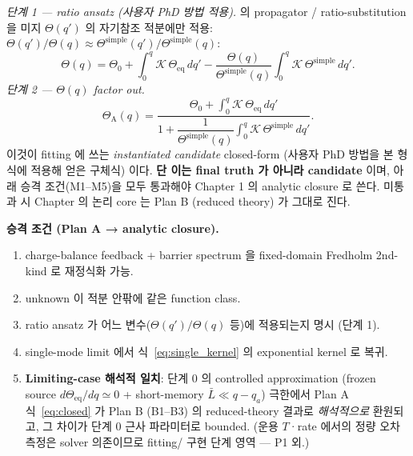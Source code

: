 \documentclass[11pt,a4paper]{article}
\newcommand{\eq}{\mathrm{eq}}
\newcommand{\simplecase}{\mathrm{simple}}
\begin{document}
\emph{단계 1 — ratio ansatz (사용자 PhD 방법 적용).} \cite{lee2011,son2013} 의 propagator /
ratio-substitution 을 미지 $\Theta(q')$ 의 자기참조 적분에만 적용:
$\Theta(q')/\Theta(q)\approx\Theta^{\simplecase}(q')/\Theta^{\simplecase}(q)$:
\begin{equation}
\Theta(q)=\Theta_0+\int_0^q\!\mathcal K\,\Theta_\eq\,dq'
-\frac{\Theta(q)}{\Theta^{\simplecase}(q)}\int_0^q\!\mathcal K\,\Theta^{\simplecase}\,dq'.
\label{eq:closed_pre}
\end{equation}
\emph{단계 2 — $\Theta(q)$ factor out.}
\begin{equation}
\boxed{\;\Theta_{\mathrm A}(q)=\frac{\Theta_0+\displaystyle\int_0^q \mathcal K\,\Theta_\eq\,dq'}
{1+\dfrac{1}{\Theta^{\simplecase}(q)}\displaystyle\int_0^q \mathcal K\,\Theta^{\simplecase}\,dq'}.\;}
\label{eq:closed}
\end{equation}
이것이 fitting 에 쓰는 \emph{instantiated candidate} closed-form (사용자 PhD 방법을 본 형식에
적용해 얻은 구체식) 이다. \textbf{단 이는 final truth 가 아니라 candidate} 이며, 아래 승격
조건(M1--M5)을 모두 통과해야 Chapter 1 의 analytic closure 로 쓴다. 미통과 시 Chapter 의
논리 core 는 Plan B (reduced theory) 가 그대로 진다.

\textbf{승격 조건 (Plan A → analytic closure).}
\begin{enumerate}[label=\textbf{M\arabic*.}]
\item charge-balance feedback + barrier spectrum 을 fixed-domain Fredholm 2nd-kind 로
  재정식화 가능.
\item unknown 이 적분 안팎에 같은 function class.
\item ratio ansatz 가 어느 변수($\Theta(q')/\Theta(q)$ 등)에 적용되는지 명시 (단계 1).
\item single-mode limit 에서 식~\eqref{eq:single_kernel} 의 exponential kernel 로 복귀.
\item \textbf{Limiting-case 해석적 일치}: 단계 0 의 controlled approximation (frozen source
  $d\Theta_\eq/dq\simeq0$ + short-memory $\bar L\ll q-q_a$) 극한에서 Plan A 식~\eqref{eq:closed}
  가 Plan B (B1--B3) 의 reduced-theory 결과로 \emph{해석적으로} 환원되고, 그 차이가 단계 0
  근사 파라미터로 bounded. (운용 $T$·rate 에서의 정량 오차 측정은 solver 의존이므로 fitting/
  구현 단계 영역 — P1 외.)
\end{enumerate}
\end{document}

